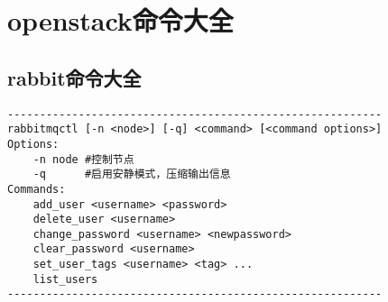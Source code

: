 \documentclass[a4paper,left=1.5cm,right=1.5cm,11pt]{article}
\begin{document}
\tableofcontents

\clearpage


\section{openstack命令大全}

\subsection{rabbit命令大全}
\begin{lstlisting}
----------------------------------------------------------
rabbitmqctl [-n <node>] [-q] <command> [<command options>] 
Options:
    -n node #控制节点
    -q      #启用安静模式，压缩输出信息
Commands:
	add_user <username> <password>
    delete_user <username>
    change_password <username> <newpassword>
    clear_password <username>
    set_user_tags <username> <tag> ...
    list_users
----------------------------------------------------------
\end{lstlisting}
\end{document}
